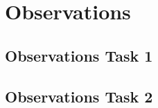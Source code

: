 \section{Observations}\label{sec:observations}


\subsection{Observations Task 1}



\subsection{Observations Task 2}



